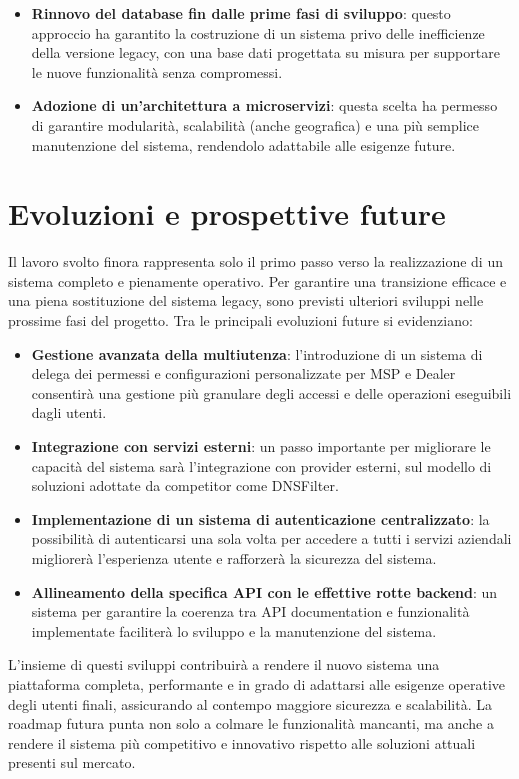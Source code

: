 \begin{itemize}
  \item \textbf{Rinnovo del database fin dalle prime fasi di sviluppo}: questo approccio ha garantito la costruzione di un sistema privo delle inefficienze della versione legacy, con una base dati progettata su misura per supportare le nuove funzionalità senza compromessi.
  \item \textbf{Adozione di un'architettura a microservizi}: questa scelta ha permesso di garantire modularità, scalabilità (anche geografica) e una più semplice manutenzione del sistema, rendendolo adattabile alle esigenze future.
\end{itemize}

\section{Evoluzioni e prospettive future}
Il lavoro svolto finora rappresenta solo il primo passo verso la realizzazione di un sistema completo e pienamente operativo. Per garantire una transizione efficace e una piena sostituzione del sistema legacy, sono previsti ulteriori sviluppi nelle prossime fasi del progetto. Tra le principali evoluzioni future si evidenziano:

\begin{itemize}
  \item \textbf{Gestione avanzata della multiutenza}: l’introduzione di un sistema di delega dei permessi e configurazioni personalizzate per MSP e Dealer consentirà una gestione più granulare degli accessi e delle operazioni eseguibili dagli utenti.
  \item \textbf{Integrazione con servizi esterni}: un passo importante per migliorare le capacità del sistema sarà l'integrazione con provider esterni, sul modello di soluzioni adottate da competitor come DNSFilter.
  \item \textbf{Implementazione di un sistema di autenticazione centralizzato}: la possibilità di autenticarsi una sola volta per accedere a tutti i servizi aziendali migliorerà l'esperienza utente e rafforzerà la sicurezza del sistema.
  \item \textbf{Allineamento della specifica API con le effettive rotte backend}: un sistema per garantire la coerenza tra API documentation e funzionalità implementate faciliterà lo sviluppo e la manutenzione del sistema.
\end{itemize}

L’insieme di questi sviluppi contribuirà a rendere il nuovo sistema una piattaforma completa, performante e in grado di adattarsi alle esigenze operative degli utenti finali, assicurando al contempo maggiore sicurezza e scalabilità. La roadmap futura punta non solo a colmare le funzionalità mancanti, ma anche a rendere il sistema più competitivo e innovativo rispetto alle soluzioni attuali presenti sul mercato.
